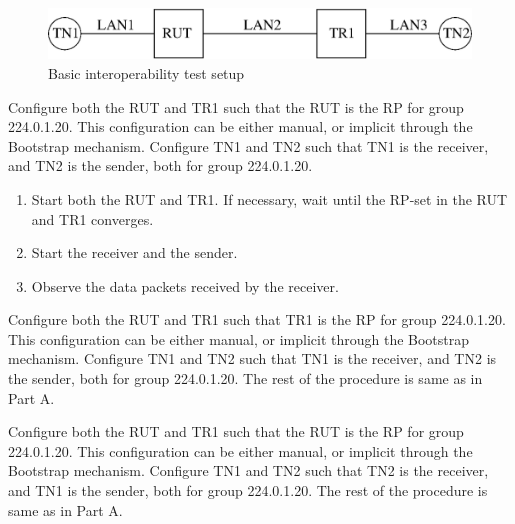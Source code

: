 \documentclass[11pt]{report}
\begin{document}
\begin{figure}[htbp]
  \begin{center}
    \includegraphics[scale=0.8]{figs/pim_test_1_1_basic_interoperability}
    \caption{Basic interoperability test setup}
    \label{fig:pim_test_1_1_basic_interoperability}
  \end{center}
\end{figure}



Configure both the RUT and TR1 such that the RUT is the RP for group
224.0.1.20. This configuration can be either manual, or implicit through the
Bootstrap mechanism. Configure TN1 and TN2 such that TN1 is the receiver, and
TN2 is the sender, both for group 224.0.1.20.

\begin{enumerate}

  \item Start both the RUT and TR1. If necessary, wait until the RP-set in the
        RUT and TR1 converges.

  \item Start the receiver and the sender.

  \item Observe the data packets received by the receiver.

\end{enumerate}


Configure both the RUT and TR1 such that TR1 is the RP for group
224.0.1.20. This configuration can be either manual, or implicit through the
Bootstrap mechanism. Configure TN1 and TN2 such that TN1 is the receiver, and
TN2 is the sender, both for group 224.0.1.20. The rest of the procedure is
same as in Part A.


Configure both the RUT and TR1 such that the RUT is the RP for group
224.0.1.20. This configuration can be either manual, or implicit through the 
Bootstrap mechanism. Configure TN1 and TN2 such that TN2 is the receiver, and
TN1 is the sender, both for group 224.0.1.20. The rest of the procedure is
same as in Part A.
\end{document}

